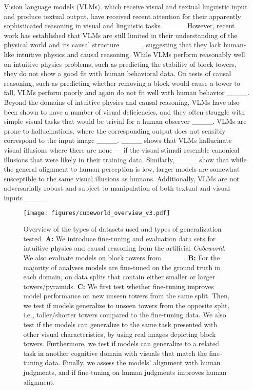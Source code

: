 Vision language models (VLMs), which receive visual and textual linguistic input and produce textual output, have received recent attention for their apparently sophisticated reasoning in visual and linguistic tasks ____. However, recent work has established that VLMs are still limited in their understanding of the physical world and its causal structure ____, suggesting that they lack human-like intuitive physics and causal reasoning. While VLMs perform reasonably well on intuitive physics problems, such as predicting the stability of block towers, they do not show a good fit with human behavioral data. On tests of causal reasoning, such as predicting whether removing a block would cause a tower to fall, VLMs perform poorly and again do not fit well with human behavior ____. Beyond the domains of intuitive physics and causal reasoning, VLMs have also been shown to have a number of visual deficiencies, and they often struggle with simple visual tasks that would be trivial for a human observer ____. VLMs are prone to hallucinations, where the corresponding output does not sensibly correspond to the input image ____. ____ shows that VLMs hallucinate visual illusions where there are none --- if the visual stimuli resemble canonical illusions that were likely in their training data. Similarly, ____ show that while the general alignment to human perception is low, larger models are somewhat susceptible to the same visual illusions as humans. Additionally, VLMs are not adversarially robust and subject to manipulation of both textual and visual inputs ____. 

\begin{figure*}[ht]
    \centering
    \vspace{0.2cm}
    \texttt{[image: figures/cubeworld\_overview\_v3.pdf]}
    \vspace{-0.4cm}
    \caption{Overview of the types of datasets used and types of generalization tested. \textbf{A:} We introduce fine-tuning and evaluation data sets for intuitive physics and causal reasoning from the artificial \emph{Cubeworld}. We also evaluate models on block towers from ____. \textbf{B:} For the majority of analyses models are fine-tuned on the ground truth in each domain, on data splits that contain either smaller or larger towers/pyramids. \textbf{C:} We first test whether fine-tuning improves model performance on new unseen towers from the same split. Then, we test if models generalize to unseen towers from the opposite split, i.e., taller/shorter towers compared to the fine-tuning data. We also test if the models can generalize to the same task presented with other visual characteristics, by using real images depicting block towers. Furthermore, we test if models can generalize to a related task in another cognitive domain with visuals that match the fine-tuning data. Finally, we assess the models' alignment with human judgments, and if fine-tuning on human judgments improves human alignment.}
    \label{fig:overview}
\end{figure*}

